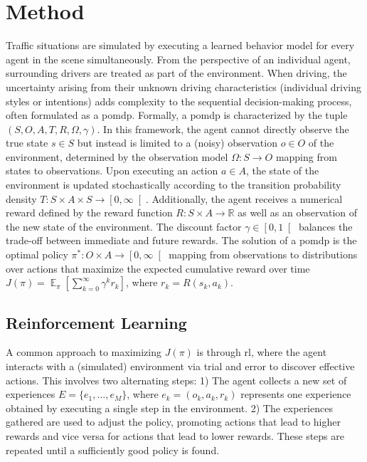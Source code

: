 \documentclass[a4paper,12pt,onecolumn]{article}
\begin{document}
\section{Method}
Traffic situations are simulated by executing a learned behavior model for every agent in the scene simultaneously. 
From the perspective of an individual agent, surrounding drivers are treated as part of the environment. When driving, the uncertainty arising from their unknown driving characteristics (\eg individual driving styles or intentions) adds complexity to the sequential decision-making process, often formulated as a \gls{pomdp}. Formally, a \gls{pomdp} is characterized by the tuple $(S, O, A, T, R, \Omega, \gamma)$. In this framework, the agent cannot directly observe the true state $s \in S$ but instead is limited to a (noisy) observation $o \in O$ of the environment, determined by the observation model $\Omega: S \rightarrow O$ mapping from states to observations. Upon executing an action $a \in A$, the state of the environment is updated stochastically according to the transition probability density $T: S \times A \times S \rightarrow \left[ 0, \infty \right[$. Additionally, the agent receives a numerical reward defined by the reward function $R: S \times A \rightarrow \mathbb{R}$ as well as an observation of the new state of the environment. The discount factor $\gamma \in \left[0, 1 \right[$ balances the trade-off between immediate and future rewards. The solution of a \gls{pomdp} is the optimal policy $\pi^*: O \times A \rightarrow \left[0, \infty \right[$ mapping from observations to distributions over actions that maximize the expected cumulative reward over time $J(\pi) = \mathop{\mathbb{E}}_{\pi} \left[ \sum_{k=0}^\infty \gamma^k r_k \right]$, where $r_k = R(s_k, a_k)$.

\subsection{Reinforcement Learning}
A common approach to maximizing $J(\pi)$ is through \gls{rl}, where the agent interacts with a (simulated) environment via trial and error to discover effective actions. 
This involves two alternating steps: 1) The agent collects a new set of experiences $E = \{ e_1, \dots, e_M \}$, where $e_k = \left(o_k, a_k, r_k \right)$ represents one experience obtained by executing a single step in the environment. 2) The experiences gathered are used to adjust the policy, promoting actions that lead to higher rewards and vice versa for actions that lead to lower rewards. These steps are repeated until a sufficiently good policy is found. 
\end{document}
